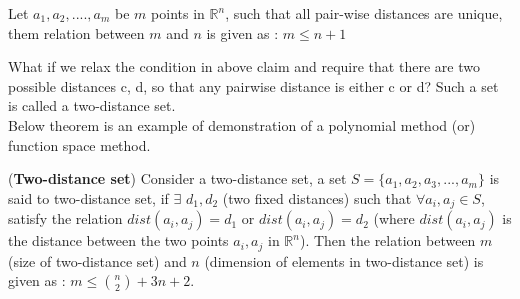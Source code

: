 \begin{claim}
Let $a_1,a_2,....,a_m$ be $m$ points in $\mathbb{R}^{n}$, such that all pair-wise distances are unique, them relation between $m$ and $n$ is given as : $m \le n+1$ 
\end{claim}
What if we relax the condition in above claim and require that there are two possible distances c, d, so that any pairwise distance is either c or d? Such a set is called a two-distance set.
\\
Below theorem is an example of demonstration of a polynomial method (or) function space method.
\\
\begin{theorem}(\textbf{Two-distance set}) Consider a two-distance set, a set $S = \{a_1,a_2,a_3,...,a_m\}$ is said to two-distance set, if $\exists$ $d_1, d_2$ (two fixed distances) such that $\forall a_i, a_j \in S$, satisfy the relation $dist(a_i, a_j) = d_1$ or $dist(a_i, a_j) = d_2$ (where $dist(a_i, a_j)$ is the distance between the two points $a_i,a_j$ in $\mathbb{R}^{n}$).
Then the relation between $m$ (size of two-distance set) and $n$ (dimension of elements in two-distance set) is given as : $m \le {n \choose 2} + 3n +2$.
\end{theorem}
